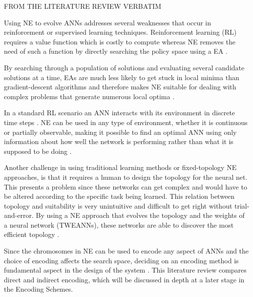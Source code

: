 FROM THE LITERATURE REVIEW VERBATIM


Using NE to evolve ANNs addresses several weaknesses that occur in reinforcement or supervised learning techniques. Reinforcement learning (RL) requires a value function which is costly to compute whereas NE removes the need of such a function by directly searching the policy space using a EA \cite{RefWorks:32}.

By searching through a population of solutions and evaluating several candidate solutions at a time, EAs are much less likely to get stuck in local minima than gradient-descent algorithms and therefore makes NE suitable for dealing with complex problems that generate numerous local optima \cite{gomez2001neuro,RefWorks:1}.

In a standard RL scenario an ANN interacts with its environment in discrete time steps \cite{igel2003neuroevolution}. NE can be used in any type of environment, whether it is continuous or partially observable, making it possible to find an optimal ANN using only information about how well the network is performing rather than what it is supposed to be doing \cite{Miikkulainen:2010:ENN:1830761.1830902}.

Another challenge in using traditional learning methods or fixed-topology NE approaches, is that it requires a human to design the topology for the neural net. This presents a problem since these networks can get complex and would have to be altered according to the specific task being learned. This relation between topology and suitability is very unintuitive and difficult to get right without trial-and-error. By using a NE approach that evolves the topology and the weights of a neural network (TWEANNs), these networks are able to discover the most efficient topology \cite{RefWorks:31}.

Since the chromosomes in NE can be used to encode any aspect of ANNs and the choice of encoding affects the search space, deciding on an encoding method is fundamental aspect in the design of the system \cite{RefWorks:31}. This literature review compares direct and indirect encoding, which will be discussed in depth at a later stage in the Encoding Schemes.





